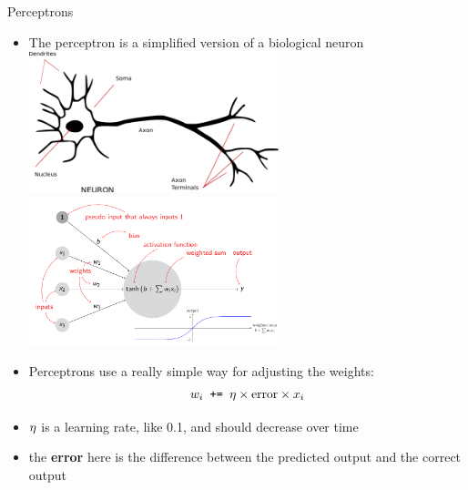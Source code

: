 \documentclass[xcolor=pdftex,x11names,table,hyperref]{beamer}
\begin{document}
\begin{frame}{Perceptrons}
\begin{itemize}
	\item The perceptron is a simplified version of a biological neuron
		\hspace{-5.0em}%
		\includegraphics[width=0.57\textwidth]{images/Neuron_-_annotated.png}%
		\includegraphics[width=0.57\textwidth]{images/kata_perceptron.png}
	\item Perceptrons use a really simple way for adjusting the weights:
		\begin{equation*}
			w_i {\text{\tt{ +=\ }}} \eta \times \text{error} \times x_i
		\end{equation*}
	\item $\bf \eta$ is a learning rate, like 0.1, and should decrease over time \\
	\item the \textbf{error} here is the difference between the predicted output and the correct output
\end{itemize}
\end{frame}
\end{document}
